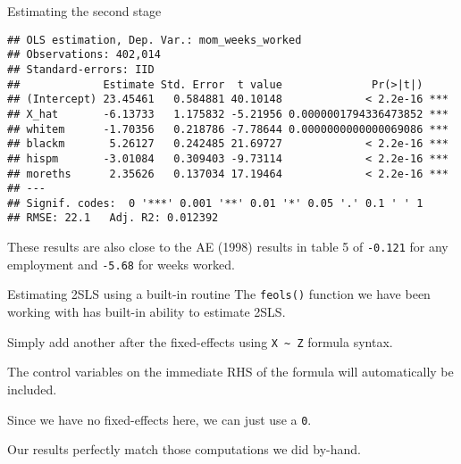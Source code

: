 \documentclass[
  ignorenonframetext,
]{beamer}
\begin{document}
\begin{frame}[fragile]{Estimating the second stage}
\begin{verbatim}
## OLS estimation, Dep. Var.: mom_weeks_worked
## Observations: 402,014
## Standard-errors: IID 
##             Estimate Std. Error  t value              Pr(>|t|)    
## (Intercept) 23.45461   0.584881 40.10148             < 2.2e-16 ***
## X_hat       -6.13733   1.175832 -5.21956 0.0000001794336473852 ***
## whitem      -1.70356   0.218786 -7.78644 0.0000000000000069086 ***
## blackm       5.26127   0.242485 21.69727             < 2.2e-16 ***
## hispm       -3.01084   0.309403 -9.73114             < 2.2e-16 ***
## moreths      2.35626   0.137034 17.19464             < 2.2e-16 ***
## ---
## Signif. codes:  0 '***' 0.001 '**' 0.01 '*' 0.05 '.' 0.1 ' ' 1
## RMSE: 22.1   Adj. R2: 0.012392
\end{verbatim}

These results are also close to the AE (1998) results in table 5 of
\texttt{-0.121} for any employment and \texttt{-5.68} for weeks worked.
\end{frame}

\begin{frame}[fragile]{Estimating 2SLS using a built-in routine}
\label{estimating-2sls-using-a-built-in-routine}
The \texttt{feols()} function we have been working with has built-in
ability to estimate 2SLS.

Simply add another \texttt{\textbar{}} after the fixed-effects using
\texttt{X\ \textasciitilde{}\ Z} formula syntax.

The control variables on the immediate RHS of the formula will
automatically be included.

Since we have no fixed-effects here, we can just use a \texttt{0}.

Our results perfectly match those computations we did by-hand.
\end{frame}
\end{document}
